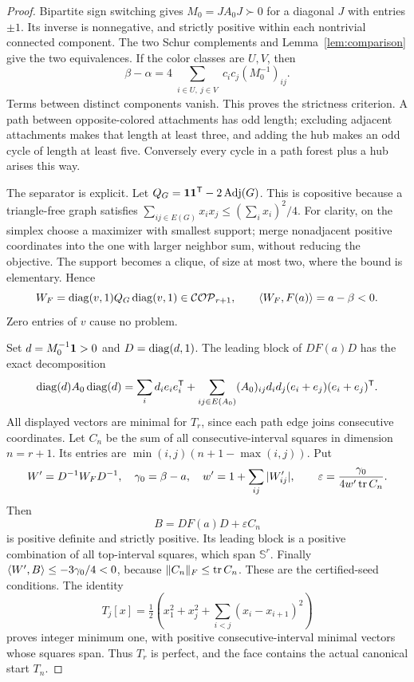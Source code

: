 \documentclass[11pt]{article}
\theoremstyle{definition}\newtheorem{definition}[theorem]{Definition}
\theoremstyle{remark}\newtheorem{remark}[theorem]{Remark}
\newcommand{\T}{^{\mathsf T}}\newcommand{\norm}[1]{\lVert #1\rVert}
\begin{document}
\begin{proof}
Bipartite sign switching gives $M_0=JA_0J\succ0$ for a diagonal $J$ with entries $\pm1$. Its inverse is nonnegative, and strictly positive within each nontrivial connected component. The two Schur complements and Lemma~\ref{lem:comparison} give the two equivalences. If the color classes are $U,V$, then
\[
 \beta-\alpha
 =4\sum_{\substack{i\in U,\ j\in V}}c_ic_j(M_0^{-1})_{ij}.
\]
Terms between distinct components vanish. This proves the strictness criterion. A path between opposite-colored attachments has odd length; excluding adjacent attachments makes that length at least three, and adding the hub makes an odd cycle of length at least five. Conversely every cycle in a path forest plus a hub arises this way.

The separator is explicit. Let $Q_G={\bf1}{\bf1}\T-2\operatorname{Adj}(G)$. This is copositive because a triangle-free graph satisfies
$\sum_{ij\in E(G)}x_ix_j\le(\sum_i x_i)^2/4$. For clarity, on the simplex choose a maximizer with smallest support; merge nonadjacent positive coordinates into the one with larger neighbor sum, without reducing the objective. The support becomes a clique, of size at most two, where the bound is elementary. Hence
\[
 W_F=\operatorname{diag}(v,1)Q_G\operatorname{diag}(v,1)\in\mathcal{COP}_{r+1},\qquad
 \langle W_F,F(a)\rangle=a-\beta<0.
\]
Zero entries of $v$ cause no problem.

Set $d=M_0^{-1}{\bf1}>0$ and $D=\operatorname{diag}(d,1)$. The leading block of $DF(a)D$ has the exact decomposition
\[
 \diag(d)A_0\diag(d)
 =\sum_i d_i e_ie_i\T
 +\sum_{ij\in E(A_0)}(A_0)_{ij}d_id_j(e_i+e_j)(e_i+e_j)\T.
\]
All displayed vectors are minimal for $T_r$, since each path edge joins consecutive coordinates. Let $C_n$ be the sum of all consecutive-interval squares in dimension $n=r+1$. Its entries are $\min(i,j)(n+1-\max(i,j))$. Put
\[
 W'=D^{-1}W_FD^{-1},\quad \gamma_0=\beta-a,\quad
 w'=1+\sum_{ij}|W'_{ij}|,\qquad
 \varepsilon=\frac{\gamma_0}{4w'\operatorname{tr} C_n}.
\]
Then
\[
 B=DF(a)D+\varepsilon C_n
\]
is positive definite and strictly positive. Its leading block is a positive combination of all top-interval squares, which span $\mathbb S^r$. Finally
$\langle W',B\rangle\le-3\gamma_0/4<0$, because $\norm{C_n}_F\le\tr C_n$. These are the certified-seed conditions. The identity
\[
 T_j[x]=\tfrac12\left(x_1^2+x_j^2+\sum_{i<j}(x_i-x_{i+1})^2\right)
\]
proves integer minimum one, with positive consecutive-interval minimal vectors whose squares span. Thus $T_r$ is perfect, and the face contains the actual canonical start $T_n$.
\end{proof}
\end{document}
